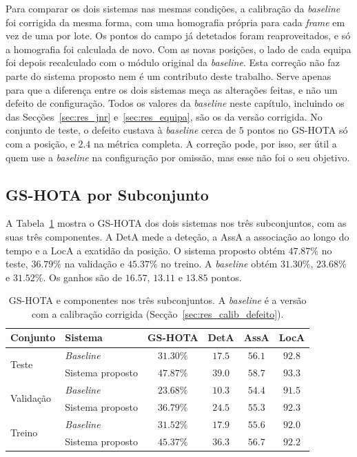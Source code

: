 Para comparar os dois sistemas nas mesmas condições, a calibração da \emph{baseline} foi corrigida da mesma forma, com uma homografia própria para cada \emph{frame} em vez de uma por lote. Os pontos do campo já detetados foram reaproveitados, e só a homografia foi calculada de novo. Com as novas posições, o lado de cada equipa foi depois recalculado com o módulo original da \emph{baseline}. Esta correção não faz parte do sistema proposto nem é um contributo deste trabalho. Serve apenas para que a diferença entre os dois sistemas meça as alterações feitas, e não um defeito de configuração. Todos os valores da \emph{baseline} neste capítulo, incluindo os das Secções~\ref{sec:res_jnr} e~\ref{sec:res_equipa}, são os da versão corrigida. No conjunto de teste, o defeito custava à \emph{baseline} cerca de $5$ pontos no GS-HOTA só com a posição, e $2.4$ na métrica completa. A correção pode, por isso, ser útil a quem use a \emph{baseline} na configuração por omissão, mas esse não foi o seu objetivo.

\subsection{GS-HOTA por Subconjunto}\label{sec:res_gshota}

A Tabela~\ref{tab:gshota} mostra o GS-HOTA dos dois sistemas nos três subconjuntos, com as suas três componentes. A DetA mede a deteção, a AssA a associação ao longo do tempo e a LocA a exatidão da posição. O sistema proposto obtém $47.87\%$ no teste, $36.79\%$ na validação e $45.37\%$ no treino. A \emph{baseline} obtém $31.30\%$, $23.68\%$ e $31.52\%$. Os ganhos são de $16.57$, $13.11$ e $13.85$ pontos.

\begin{table}[H]
    \centering
    \caption{GS-HOTA e componentes nos três subconjuntos. A \emph{baseline} é a versão com a calibração corrigida (Secção~\ref{sec:res_calib_defeito}).}
    \label{tab:gshota}
    \begin{tabular}{|l|l|c|c|c|c|}
        \hline
        \textbf{Conjunto} & \textbf{Sistema} & \textbf{GS-HOTA} & \textbf{DetA} & \textbf{AssA} & \textbf{LocA} \\
        \hline
        \multirow{2}{*}{Teste}     & \emph{Baseline}  & $31.30\%$ & $17.5$ & $56.1$ & $92.8$ \\
        \cline{2-6}
                                   & Sistema proposto & $47.87\%$ & $39.0$ & $58.7$ & $93.3$ \\
        \hline
        \multirow{2}{*}{Validação} & \emph{Baseline}  & $23.68\%$ & $10.3$ & $54.4$ & $91.5$ \\
        \cline{2-6}
                                   & Sistema proposto & $36.79\%$ & $24.5$ & $55.3$ & $92.3$ \\
        \hline
        \multirow{2}{*}{Treino}    & \emph{Baseline}  & $31.52\%$ & $17.9$ & $55.6$ & $92.0$ \\
        \cline{2-6}
                                   & Sistema proposto & $45.37\%$ & $36.3$ & $56.7$ & $92.2$ \\
        \hline
    \end{tabular}
\end{table}

